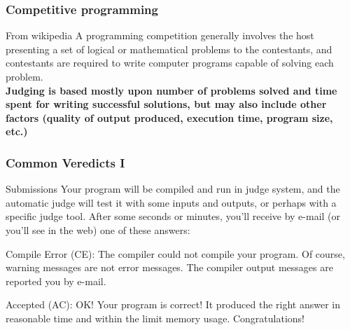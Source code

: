 \documentclass{beamer}
\begin{document}
\begin{frame}
	\frametitle{Competitive programming}
		\begin{block}{From wikipedia}
		A programming competition generally involves the host presenting a set of logical or 	mathematical problems to the contestants, and contestants are required to write computer programs capable of solving each problem. \newline \\
		\textbf{Judging is based mostly upon number of problems solved and time spent for 	writing successful solutions, but may also include other factors (quality of output produced, execution time, program size, etc.)}
		\end{block}
\end{frame}

\begin{frame}
	\frametitle {Common Veredicts I}
	\begin{block}{Submissions}
	Your program will be compiled and run in judge system, and the automatic judge will test 	it with some inputs and outputs, or perhaps with a specific judge tool. After some seconds or minutes, you'll receive by e-mail (or you'll see in the web) one of these answers:
	\end{block}
	
	\begin{block}{Compile Error (CE):}
	The compiler could not compile your program. Of course, warning messages are not error messages. The compiler output messages are reported you by e-mail.
	\end{block}
	
	\begin{block}{Accepted (AC):}
	OK! Your program is correct! It produced the right answer in reasonable time and within the limit memory usage. Congratulations!
	\end{block}
	
	

\end{frame}
\end{document}
